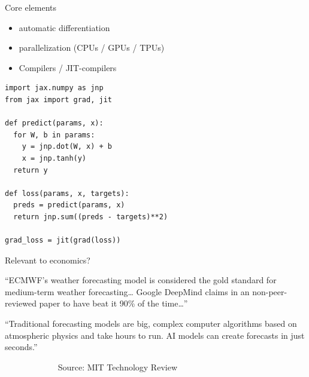 \documentclass[
    xcolor={svgnames,dvipsnames},
    hyperref={colorlinks, citecolor=DeepPink4, linkcolor=DarkRed, urlcolor=DarkBlue}
    ]{beamer}  %
\newcommand{\1}{\mathbbm 1}
\begin{document}
\begin{frame}
    

    Core elements
    \begin{itemize}
        \item automatic differentiation
        \vspace{0.5em}
        \item parallelization (CPUs / GPUs / TPUs)
        \vspace{0.5em}
        \item Compilers / JIT-compilers
    \end{itemize}

\end{frame}


\begin{frame}[fragile]
    
    \begin{verbatim}
import jax.numpy as jnp
from jax import grad, jit

def predict(params, x):
  for W, b in params:
    y = jnp.dot(W, x) + b
    x = jnp.tanh(y)  
  return y                

def loss(params, x, targets):
  preds = predict(params, x)
  return jnp.sum((preds - targets)**2)

grad_loss = jit(grad(loss))  
    \end{verbatim}

\end{frame}




\begin{frame}

    Relevant to economics?

    \vspace{0.5em}
    \vspace{0.5em}
    
    ``ECMWF's weather forecasting model is considered the gold standard for
        medium-term weather forecasting\ldots 
        Google DeepMind claims
        in an non-peer-reviewed paper to have beat it 90\% of the time\ldots''

    \vspace{0.5em}
    \vspace{0.5em}

    ``Traditional forecasting models are big, complex computer algorithms based
    on atmospheric physics and take hours to run. AI models can create forecasts
    in just seconds.'' 
    \vspace{0.5em}
    \vspace{0.5em}

    $\quad \qquad$$\quad \qquad$ Source: MIT Technology Review  



\end{frame}
\end{document}
